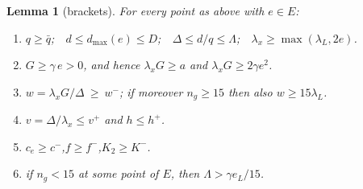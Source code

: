 \documentclass[11pt]{amsart}
\newtheorem{lemma}[theorem]{Lemma}
\begin{document}
\begin{lemma}[brackets]\label{lem:bracket}
For every point as above with $e\in E$:
\begin{enumerate}
\item[(a)] $q\ge\bar q$;\ \ $d\le d_{\max}(e)\le D$;\ \
  $\Delta\le d/q\le\Lambda$;\ \ $\lambda_x\ge\max(\lambda_L,2e)$.
\item[(b)] $G\ge\gamma\,e>0$, and hence
  $\lambda_xG\ge a$ and $\lambda_xG\ge2\gamma e^2$.
\item[(c)] $w=\lambda_xG/\Delta\ \ge\ w^-$; if moreover $n_g\ge15$ then also
  $w\ge15\lambda_L$.
\item[(d)] $v=\Delta/\lambda_x\le v^+$ and $h\le h^+$.
\item[(e)] $c_e\ge c^-$,\quad $f\ge f^-$,\quad $K_2\ge K^-$.
\item[(f)] if $n_g<15$ at some point of $E$, then $\Lambda>\gamma e_L/15$.
\end{enumerate}
\end{lemma}
\end{document}
